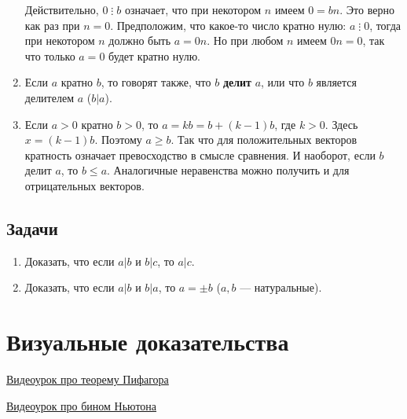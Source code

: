 \begin{enumerate}
Действительно, $0\mathop{\vdots} b$ означает, что при некотором $n$ имеем $0=bn$. Это верно как раз при $n=0$. Предположим, что какое-то число кратно нулю: $a\mathop{\vdots} 0$, тогда при некотором $n$ должно быть $a=0n$. Но при любом $n$ имеем $0n=0$, так что только $a=0$ будет кратно нулю.

\item Если $a$ кратно $b$, то говорят также, что $b$ \textbf{делит} $a$, или что $b$ является делителем $a$ ($b|a$).
\item Если $a>0$ кратно $b>0$, то $a=kb=b+(k-1)b$, где $k>0$. Здесь $x=(k-1)b$. Поэтому $a\ge b$. Так что для положительных векторов кратность означает превосходство в смысле сравнения. И наоборот, если $b$ делит $a$, то $b\le a$. Аналогичные неравенства можно получить и для отрицательных векторов.
\end{enumerate}
\subsection*{Задачи}
\begin{enumerate}
\item Доказать, что если $a|b$ и $b|c$, то $a|c$.
\item Доказать, что если $a|b$ и $b|a$, то $a=\pm b$ ($a,b$ --- натуральные).
\end{enumerate}


\section{Визуальные доказательства}

\href{https://www.youtube.com/watch?v=Xdc8WWFURA8}{Видеоурок про теорему Пифагора}

\href{https://www.youtube.com/watch?v=YXYQmxLDtMw}{Видеоурок про бином Ньютона}

